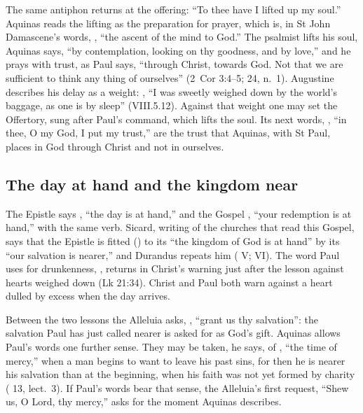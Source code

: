 The same antiphon returns at the offering: ``To thee have I lifted up my
soul.'' Aquinas reads the lifting as the preparation for prayer, which is, in
St John Damascene's words, , ``the ascent
of the mind to God.'' The psalmist lifts his soul, Aquinas says, ``by
contemplation, looking on thy goodness, and by love,'' and he prays with
trust, as Paul says, ``through Christ, towards God. Not that we are
sufficient to think any thing of ourselves'' (2~Cor 3:4--5;  24,
n.~1). Augustine describes his delay as a weight: , ``I was sweetly weighed down by the
world's baggage, as one is by sleep'' (VIII.5.12). Against that weight one may
set the Offertory, sung after Paul's command, which lifts the soul. Its next
words, , ``in thee, O my God, I put my
trust,'' are the trust that Aquinas, with St Paul, places in God through
Christ and not in ourselves.

\subsection{The day at hand and the kingdom near}

The Epistle says , ``the day is at hand,''
and the Gospel , ``your redemption is at
hand,'' with the same verb. Sicard, writing of the churches that read this
Gospel, says that the Epistle is fitted () to its ``the
kingdom of God is at hand'' by its ``our salvation is nearer,'' and Durandus
repeats him ( V;  VI). The word Paul uses for
drunkenness, , returns in Christ's warning just after the
lesson against hearts weighed down  (Lk
21:34). Christ and Paul both warn against a heart dulled by excess when the
day arrives.

Between the two lessons the Alleluia asks, ,
``grant us thy salvation'': the salvation Paul has just called nearer is
asked for as God's gift. Aquinas allows Paul's words one further sense. They
may be taken, he says, of , ``the time of mercy,''
when a man begins to want to leave his past sins, for then he is nearer his
salvation than at the beginning, when his faith was not yet formed by charity
( 13, lect.~3). If Paul's words bear that
sense, the Alleluia's first request, ``Shew us, O Lord, thy mercy,'' asks for
the moment Aquinas describes.

